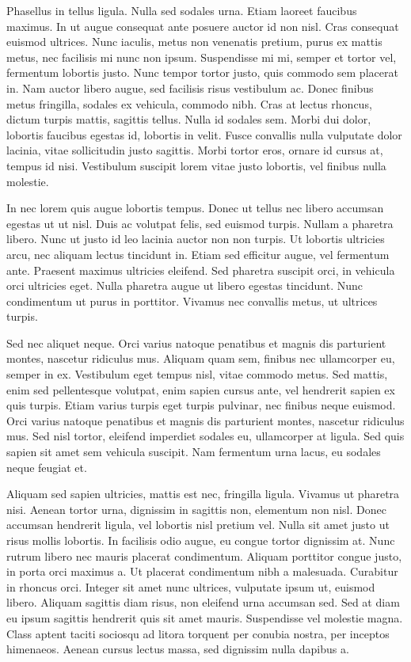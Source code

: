 Phasellus in tellus ligula. Nulla sed sodales urna. Etiam laoreet faucibus maximus. In ut augue consequat ante posuere auctor id non nisl. Cras consequat euismod ultrices. Nunc iaculis, metus non venenatis pretium, purus ex mattis metus, nec facilisis mi nunc non ipsum. Suspendisse mi mi, semper et tortor vel, fermentum lobortis justo. Nunc tempor tortor justo, quis commodo sem placerat in. Nam auctor libero augue, sed facilisis risus vestibulum ac. Donec finibus metus fringilla, sodales ex vehicula, commodo nibh. Cras at lectus rhoncus, dictum turpis mattis, sagittis tellus. Nulla id sodales sem. Morbi dui dolor, lobortis faucibus egestas id, lobortis in velit. Fusce convallis nulla vulputate dolor lacinia, vitae sollicitudin justo sagittis. Morbi tortor eros, ornare id cursus at, tempus id nisi. Vestibulum suscipit lorem vitae justo lobortis, vel finibus nulla molestie.

In nec lorem quis augue lobortis tempus. Donec ut tellus nec libero accumsan egestas ut ut nisl. Duis ac volutpat felis, sed euismod turpis. Nullam a pharetra libero. Nunc ut justo id leo lacinia auctor non non turpis. Ut lobortis ultricies arcu, nec aliquam lectus tincidunt in. Etiam sed efficitur augue, vel fermentum ante. Praesent maximus ultricies eleifend. Sed pharetra suscipit orci, in vehicula orci ultricies eget. Nulla pharetra augue ut libero egestas tincidunt. Nunc condimentum ut purus in porttitor. Vivamus nec convallis metus, ut ultrices turpis.

Sed nec aliquet neque. Orci varius natoque penatibus et magnis dis parturient montes, nascetur ridiculus mus. Aliquam quam sem, finibus nec ullamcorper eu, semper in ex. Vestibulum eget tempus nisl, vitae commodo metus. Sed mattis, enim sed pellentesque volutpat, enim sapien cursus ante, vel hendrerit sapien ex quis turpis. Etiam varius turpis eget turpis pulvinar, nec finibus neque euismod. Orci varius natoque penatibus et magnis dis parturient montes, nascetur ridiculus mus. Sed nisl tortor, eleifend imperdiet sodales eu, ullamcorper at ligula. Sed quis sapien sit amet sem vehicula suscipit. Nam fermentum urna lacus, eu sodales neque feugiat et.

Aliquam sed sapien ultricies, mattis est nec, fringilla ligula. Vivamus ut pharetra nisi. Aenean tortor urna, dignissim in sagittis non, elementum non nisl. Donec accumsan hendrerit ligula, vel lobortis nisl pretium vel. Nulla sit amet justo ut risus mollis lobortis. In facilisis odio augue, eu congue tortor dignissim at. Nunc rutrum libero nec mauris placerat condimentum. Aliquam porttitor congue justo, in porta orci maximus a. Ut placerat condimentum nibh a malesuada. Curabitur in rhoncus orci. Integer sit amet nunc ultrices, vulputate ipsum ut, euismod libero. Aliquam sagittis diam risus, non eleifend urna accumsan sed. Sed at diam eu ipsum sagittis hendrerit quis sit amet mauris. Suspendisse vel molestie magna. Class aptent taciti sociosqu ad litora torquent per conubia nostra, per inceptos himenaeos. Aenean cursus lectus massa, sed dignissim nulla dapibus a.

